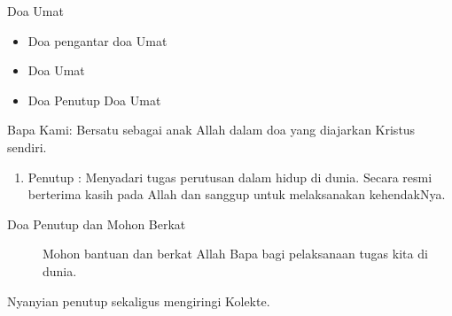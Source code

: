 \documentclass{article}
\begin{document}
\begin{description}
\item[Doa Umat ]

\end{description}
\begin{itemize}
\item Doa pengantar doa Umat 
\item Doa Umat
\item Doa Penutup Doa Umat
\end{itemize}
\begin{description}
\item[Bapa Kami: Bersatu sebagai anak Allah dalam doa yang diajarkan
Kristus sendiri.]

\end{description}
\begin{enumerate}
\item \begin{description}
\item[Penutup : Menyadari tugas perutusan dalam hidup di dunia. Secara
resmi berterima kasih pada Allah dan sanggup untuk melaksanakan
kehendakNya.]
\end{description}
\end{enumerate}
\begin{description}
\item[Doa Penutup dan Mohon Berkat]

Mohon bantuan dan berkat Allah Bapa bagi pelaksanaan tugas kita di
dunia.

\item[Nyanyian penutup sekaligus mengiringi Kolekte.]

\end{description}
\end{document}
